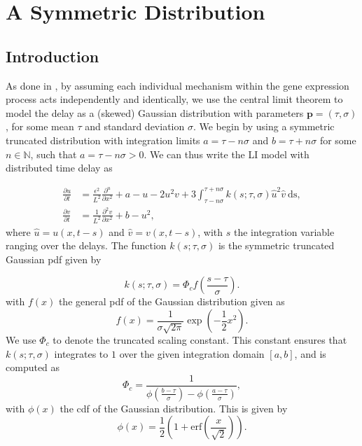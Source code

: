 \section{A Symmetric Distribution}\label{section:symmetric}
\subsection{Introduction}

As done in \cite{william}, by assuming each individual mechanism within the gene expression process acts independently and identically, we use the central limit theorem to model the delay as a (skewed) Gaussian distribution with parameters $\textbf{p}=(\tau,\sigma)$, for some mean $\tau$ and standard deviation $\sigma$. We begin by using a symmetric truncated distribution with integration limits $a=\tau-n\sigma$ and $b=\tau+n\sigma$ for some $n\in\mathbb{N}$, such that $a=\tau-n\sigma>0$. We can thus write the LI model with distributed time delay as

\begin{equation}\label{symmod}
    \begin{split}
        \frac{\partial u}{\partial t}&=\frac{\epsilon^2}{L^2}\frac{\partial^u}{\partial x^2}+a-u-2u^2v+3\int_{\tau-n\sigma}^{\tau+n\sigma}k(s;\tau,\sigma)\hat{u}^2\hat{v}\ \text{ds},\\
        \frac{\partial v}{\partial t}&=\frac{1}{L^2}\frac{\partial^2v}{\partial x^2}+b-u^2,
    \end{split}
\end{equation}
where $\hat{u}=u(x,t-s)$ and $\hat{v}=v(x,t-s)$, with $s$ the integration variable ranging over the delays. The function $k(s;\tau,\sigma)$ is the symmetric truncated Gaussian pdf given by \cite{cite}

\begin{equation}
k(s;\tau,\sigma)=\Phi_cf\left(\frac{s-\tau}{\sigma}\right).
\end{equation}
with $f(x)$ the general pdf of the Gaussian distribution given as
\begin{equation}\label{f}
    f(x)=\frac{1}{\sigma\sqrt{2\pi}}\exp\left(-\frac{1}{2}x^2\right).
\end{equation}
We use $\Phi_c$ to denote the truncated scaling constant. This constant ensures that $k(s;\tau,\sigma)$ integrates to $1$ over the given integration domain $[a,b]$, and is computed as
\begin{equation}
    \Phi_c=\frac{1}{\phi\left(\frac{b-\tau}{\sigma}\right)-\phi\left(\frac{a-\tau}{\sigma}\right)},
\end{equation}
with $\phi(x)$ the cdf of the Gaussian distribution. This is given by
\begin{equation}\label{phi}
    \phi(x)=\frac{1}{2}\left(1+\text{erf}\left(\frac{x}{\sqrt{2}}\right)\right).
\end{equation}

